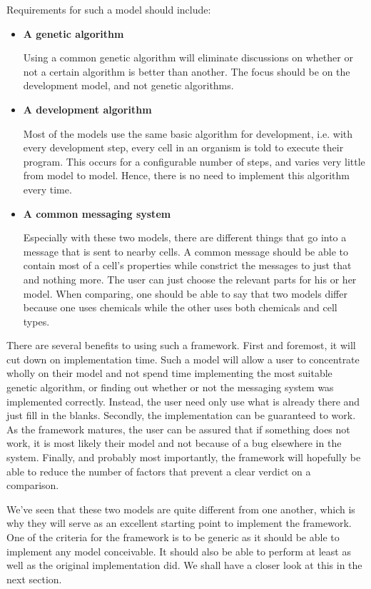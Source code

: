 Requirements for such a model should include:
\begin{itemize}
	\item\textbf{A genetic algorithm}

	Using a common genetic algorithm will eliminate discussions on whether or not a certain algorithm is better than another. The focus should be on the development model, and not genetic algorithms.

	\item\textbf{A development algorithm}

	Most of the models use the same basic algorithm for development, i.e. with every development step, every cell in an organism is told to execute their program. This occurs for a configurable number of steps, and varies very little from model to model. Hence, there is no need to implement this algorithm every time.

	\item\textbf{A common messaging system}

	Especially with these two models, there are different things that go into a message that is sent to nearby cells. A common message should be able to contain most of a cell's properties while constrict the messages to just that and nothing more. The user can just choose the relevant parts for his or her model. When comparing, one should be able to say that two models differ because one uses chemicals while the other uses both chemicals and cell types.
\end{itemize}

There are several benefits to using such a framework. First and foremost, it will cut down on implementation time. Such a model will allow a user to concentrate wholly on their model and not spend time implementing the most suitable genetic algorithm, or finding out whether or not the messaging system was implemented correctly. Instead, the user need only use what is already there and just fill in the blanks. Secondly, the implementation can be guaranteed to work. As the framework matures, the user can be assured that if something does not work, it is most likely their model and not because of a bug elsewhere in the system. Finally, and probably most importantly, the framework will hopefully be able to reduce the number of factors that prevent a clear verdict on a comparison.

We've seen that these two models are quite different from one another, which is why they will serve as an excellent starting point to implement the framework. One of the criteria for the framework is to be generic as it should be able to implement any model conceivable. It should also be able to perform at least as well as the original implementation did. We shall have a closer look at this in the next section.
